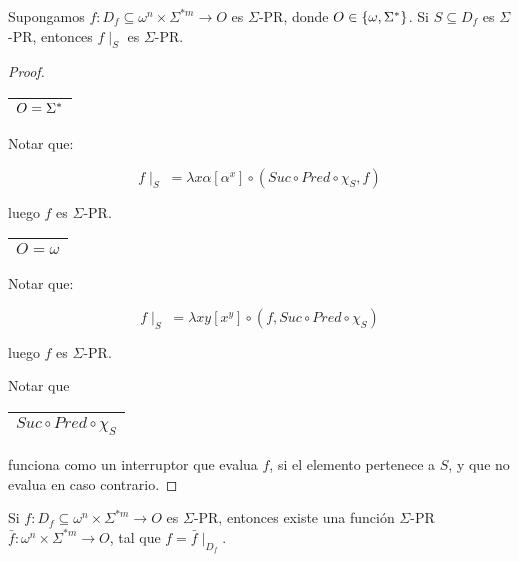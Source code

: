   \begin{lemma}
    \PN Supongamos $f: D_{f} \subseteq \omega^{n} \times \Sigma^{\ast m} \rightarrow O$ es $\Sigma$-PR, donde $O \in
    \{\omega, \Sigma^{\ast}\}$. Si $S \subseteq D_{f}$ es $\Sigma$-PR, entonces $f \mid_{S}$ es $\Sigma$-PR.
  \end{lemma}
  \begin{proof}
    \begin{tabular}{|c|} \hline $O = \Sigma^{\ast}$ \\\hline \end{tabular} Notar que:

    \[
      f \mid_{S} \; = \lambda x\alpha \left[\alpha^{x}\right] \circ (Suc \circ Pred \circ \chi_{S}, f)
    \]

    \PN luego $f$ es $\Sigma$-PR.

    \PN \begin{tabular}{|c|} \hline $O = \omega$ \\\hline \end{tabular} Notar que:

    \[
      f \mid_{S} \; = \lambda xy \left[x^{y}\right] \circ (f, Suc \circ Pred \circ \chi_{S})
    \]

    \PN luego $f$ es $\Sigma$-PR.

    \vspace{3mm}
    \PN Notar que \begin{tabular}{|c|} \hline $Suc \circ Pred \circ \chi_{S}$ \\\hline \end{tabular} funciona como un
    interruptor que evalua $f$, si el elemento pertenece a $S$, y que no evalua en caso contrario.
  \end{proof}

  \begin{lemma}
    \PN Si $f: D_{f} \subseteq \omega^{n} \times \Sigma^{\ast m} \rightarrow O$ es $\Sigma$-PR, entonces existe una
    función $\Sigma$-PR
    \PN $\bar{f}: \omega^{n} \times \Sigma^{\ast m} \rightarrow O$, tal que $f = \bar{f} \mid_{D_{f}}$.
  \end{lemma}

